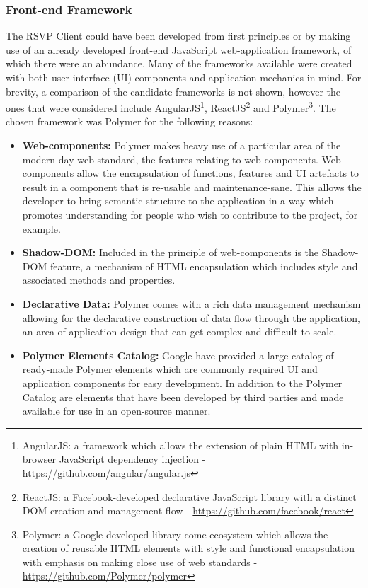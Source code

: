     \subsubsection{Front-end Framework}
      The RSVP Client could have been developed from first principles or by making use of an already developed front-end JavaScript web-application framework, of which there were an abundance. Many of the frameworks available were created with both user-interface (UI) components and application mechanics in mind. For brevity, a comparison of the candidate frameworks is not shown, however the ones that were considered include AngularJS\footnote{AngularJS: a framework which allows the extension of plain HTML with in-browser JavaScript dependency injection - \url{https://github.com/angular/angular.js}}, ReactJS\footnote{ReactJS: a Facebook-developed declarative JavaScript library with a distinct DOM creation and management flow - \url{https://github.com/facebook/react}} and Polymer\footnote{Polymer: a Google developed library come ecosystem which allows the creation of reusable HTML elements with style and functional encapsulation with emphasis on making close use of web standards - \url{https://github.com/Polymer/polymer}}. The chosen framework was Polymer for the following reasons:
      \begin{itemize}
        \item \textbf{Web-components:} Polymer makes heavy use of a particular area of the modern-day web standard, the features relating to web components. Web-components allow the encapsulation of functions, features and UI artefacts to result in a component that is re-usable and maintenance-sane. This allows the developer to bring semantic structure to the application in a way which promotes understanding for people who wish to contribute to the project, for example.
        \item \textbf{Shadow-DOM:} Included in the principle of web-components is the Shadow-DOM feature, a mechanism of HTML encapsulation which includes style and associated methods and properties.
        \item \textbf{Declarative Data:} Polymer comes with a rich data management mechanism allowing for the declarative construction of data flow through the application, an area of application design that can get complex and difficult to scale.
        \item \textbf{Polymer Elements Catalog:} Google have provided a large catalog of ready-made Polymer elements which are commonly required UI and application components for easy development. In addition to the Polymer Catalog are elements that have been developed by third parties and made available for use in an open-source manner.
      \end{itemize}
      
